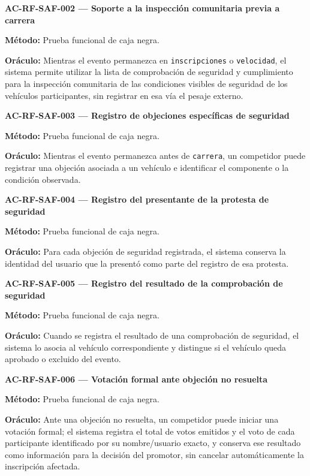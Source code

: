 \documentclass[10pt,letterpaper]{article}
\begin{document}
\noindent\textbf{AC-RF-SAF-002 --- Soporte a la inspección comunitaria previa a carrera}\par
\textbf{Método:} Prueba funcional de caja negra.\par
\textbf{Oráculo:} Mientras el evento permanezca en \texttt{inscripciones} o \texttt{velocidad}, el sistema permite utilizar la lista de comprobación de seguridad y cumplimiento para la inspección comunitaria de las condiciones visibles de seguridad de los vehículos participantes, sin registrar en esa vía el pesaje externo.\par\vspace{0.45em}
\noindent\textbf{AC-RF-SAF-003 --- Registro de objeciones específicas de seguridad}\par
\textbf{Método:} Prueba funcional de caja negra.\par
\textbf{Oráculo:} Mientras el evento permanezca antes de \texttt{carrera}, un competidor puede registrar una objeción asociada a un vehículo e identificar el componente o la condición observada.\par\vspace{0.45em}
\noindent\textbf{AC-RF-SAF-004 --- Registro del presentante de la protesta de seguridad}\par
\textbf{Método:} Prueba funcional de caja negra.\par
\textbf{Oráculo:} Para cada objeción de seguridad registrada, el sistema conserva la identidad del usuario que la presentó como parte del registro de esa protesta.\par\vspace{0.45em}
\noindent\textbf{AC-RF-SAF-005 --- Registro del resultado de la comprobación de seguridad}\par
\textbf{Método:} Prueba funcional de caja negra.\par
\textbf{Oráculo:} Cuando se registra el resultado de una comprobación de seguridad, el sistema lo asocia al vehículo correspondiente y distingue si el vehículo queda aprobado o excluido del evento.\par\vspace{0.45em}
\noindent\textbf{AC-RF-SAF-006 --- Votación formal ante objeción no resuelta}\par
\textbf{Método:} Prueba funcional de caja negra.\par
\textbf{Oráculo:} Ante una objeción no resuelta, un competidor puede iniciar una votación formal; el sistema registra el total de votos emitidos y el voto de cada participante identificado por su nombre/usuario exacto, y conserva ese resultado como información para la decisión del promotor, sin cancelar automáticamente la inscripción afectada.\par\vspace{0.45em}
\end{document}
